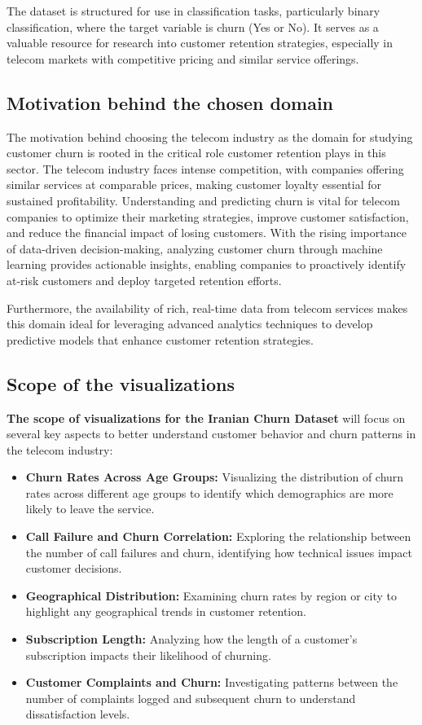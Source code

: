 \documentclass[12pt]{article}
\begin{document}
The dataset is structured for use in classification tasks, particularly binary classification, where the target variable is churn (Yes or No). It serves as a valuable resource for research into customer retention strategies, especially in telecom markets with competitive pricing and similar service offerings.

\subsection{Motivation behind the chosen domain}
The motivation behind choosing the telecom industry as the domain for studying customer churn is rooted in the critical role customer retention plays in this sector. The telecom industry faces intense competition, with companies offering similar services at comparable prices, making customer loyalty essential for sustained profitability. Understanding and predicting churn is vital for telecom companies to optimize their marketing strategies, improve customer satisfaction, and reduce the financial impact of losing customers. With the rising importance of data-driven decision-making, analyzing customer churn through machine learning provides actionable insights, enabling companies to proactively identify at-risk customers and deploy targeted retention efforts.

Furthermore, the availability of rich, real-time data from telecom services makes this domain ideal for leveraging advanced analytics techniques to develop predictive models that enhance customer retention strategies.

\subsection{Scope of the visualizations}
\textbf{The scope of visualizations for the Iranian Churn Dataset} will focus on several key aspects to better understand customer behavior and churn patterns in the telecom industry:

\begin{itemize}
    \item \textbf{Churn Rates Across Age Groups:} Visualizing the distribution of churn rates across different age groups to identify which demographics are more likely to leave the service.
    \item \textbf{Call Failure and Churn Correlation:} Exploring the relationship between the number of call failures and churn, identifying how technical issues impact customer decisions.
    \item \textbf{Geographical Distribution:} Examining churn rates by region or city to highlight any geographical trends in customer retention.
    \item \textbf{Subscription Length:} Analyzing how the length of a customer's subscription impacts their likelihood of churning.
    \item \textbf{Customer Complaints and Churn:} Investigating patterns between the number of complaints logged and subsequent churn to understand dissatisfaction levels.
\end{itemize}
\end{document}
